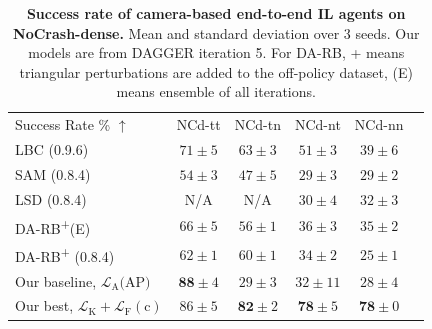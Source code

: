 \begin{table}
	\setlength{\tabcolsep}{2.67pt}
	\centering
	\begin{tabular}{lccccc}
		\toprule
		Success Rate \% $\uparrow$
		&  NCd-tt & NCd-tn  & NCd-nt & NCd-nn  \\ 
		\cmidrule(lr){1-1}\cmidrule(lr){2-5}
		LBC \cite{chen2020learning} (0.9.6) & 
		$71 \pm 5$ & $63 \pm 3$ & $51 \pm 3$ & $39 \pm 6$ \\
		SAM \cite{zhao2021sam} (0.8.4) & 
		$54 \pm 3$ & $47 \pm 5$ & $29 \pm 3$ & $29 \pm 2$ \\
		LSD \cite{ohn2020learning} (0.8.4) & 
		N/A & N/A & $30 \pm 4$ & $32 \pm 3$ \\
		DA-RB\textsuperscript{+}(E) \cite{prakash2020exploring} & 
		$66 \pm 5$ & $56 \pm 1$ & $36 \pm 3$ & $35 \pm 2$ \\
		DA-RB\textsuperscript{+} \cite{prakash2020exploring} (0.8.4)  & 
		$62 \pm 1$ & $60 \pm 1$ & $34 \pm 2$ & $25 \pm 1$ \\
		Our baseline, $\mathcal{L}_\text{A}\text{(AP)}$ & 
		$\mathbf{88} \pm 4$ & $29 \pm 3$ & $32 \pm 11$ & $28 \pm 4$ \\
		Our best, $\mathcal{L}_\text{K}+\mathcal{L}_\text{F}(\text{c})$ & 
		$86 \pm 5$ & $\mathbf{82} \pm 2$ & $\mathbf{78} \pm 5$ & $\mathbf{78} \pm 0$ \\
		\bottomrule
	\end{tabular}
	\vspace{-1ex}
	\caption{\textbf{Success rate of camera-based end-to-end IL agents on NoCrash-dense.} 
		Mean and standard deviation over 3 seeds. 
		Our models are from DAGGER iteration 5. 
		For DA-RB, + means triangular perturbations are added to the off-policy dataset, (E) means ensemble of all iterations.}
	\label{table:sucess_rate_nc_dense}
	\vspace{-2ex}
\end{table}

